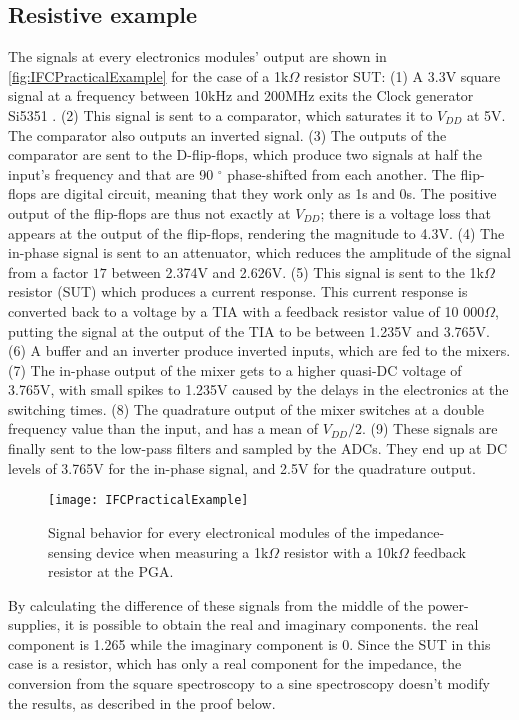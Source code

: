 \subsection{Resistive example}
The signals at every electronics modules' output are shown in \autoref{fig:IFCPracticalExample} for the case of a 1k$\Omega$ resistor SUT: (1) A 3.3V square signal at a frequency between 10kHz and 200MHz exits the Clock generator Si5351 \cite{si5351datasheet}. (2) This signal is sent to a comparator, which saturates it to $V_{DD}$ at 5V. The comparator also outputs an inverted signal. (3) The outputs of the comparator are sent to the D-flip-flops, which produce two signals at half the input's frequency and that are 90 $^\circ$ phase-shifted from each another. The flip-flops are digital circuit, meaning that they work only as 1s and 0s. The positive output of the flip-flops are thus not exactly at $V_{DD}$; there is a voltage loss that appears at the output of the flip-flops, rendering the magnitude to 4.3V. (4) The in-phase signal is sent to an attenuator, which reduces the amplitude of the signal from a factor $17$ between 2.374V and 2.626V. (5) This signal is sent to the 1k$\Omega$ resistor (SUT) which produces a current response. This current response is converted back to a voltage by a TIA with a feedback resistor value of 10 000$\Omega$, putting the signal at the output of the TIA to be between 1.235V and 3.765V. (6) A buffer and an inverter produce inverted inputs, which are fed to the mixers. (7) The in-phase output of the mixer gets to a higher quasi-DC voltage of 3.765V, with small spikes to 1.235V caused by the delays in the electronics at the switching times. (8) The quadrature output of the mixer switches at a double frequency value than the input, and has a mean of $V_{DD}/2$. (9) These signals are finally sent to the low-pass filters and sampled by the ADCs. They end up at DC levels of 3.765V for the in-phase signal, and 2.5V for the quadrature output. \par
\begin{figure}[h]
    \centering
    \texttt{[image: IFCPracticalExample]}
    \caption{Signal behavior for every electronical modules of the impedance-sensing device when measuring a 1k$\Omega$ resistor with a 10k$\Omega$ feedback resistor at the PGA.}
    \label{fig:IFCPracticalExample}
\end{figure}
By calculating the difference of these signals from the middle of the power-supplies, it is possible to obtain the real and imaginary components. the real component is 1.265 while the imaginary component is 0. Since the SUT in this case is a resistor, which has only a real component for the impedance, the conversion from the square spectroscopy to a sine spectroscopy doesn't modify the results, as described in the proof below. 
